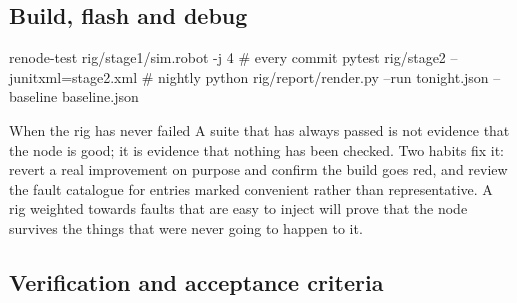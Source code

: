 \subsection*{Build, flash and debug}


\begin{shellcode}
renode-test rig/stage1/sim.robot -j 4                       # every commit
pytest rig/stage2 --junitxml=stage2.xml                     # nightly
python rig/report/render.py --run tonight.json --baseline baseline.json
\end{shellcode}

\begin{note}{When the rig has never failed}
A suite that has always passed is not evidence that the node is good; it is
evidence that nothing has been checked. Two habits fix it: revert a real
improvement on purpose and confirm the build goes red, and review the fault
catalogue for entries marked convenient rather than representative. A rig
weighted towards faults that are easy to inject will prove that the node
survives the things that were never going to happen to it.
\end{note}

\subsection*{Verification and acceptance criteria}

